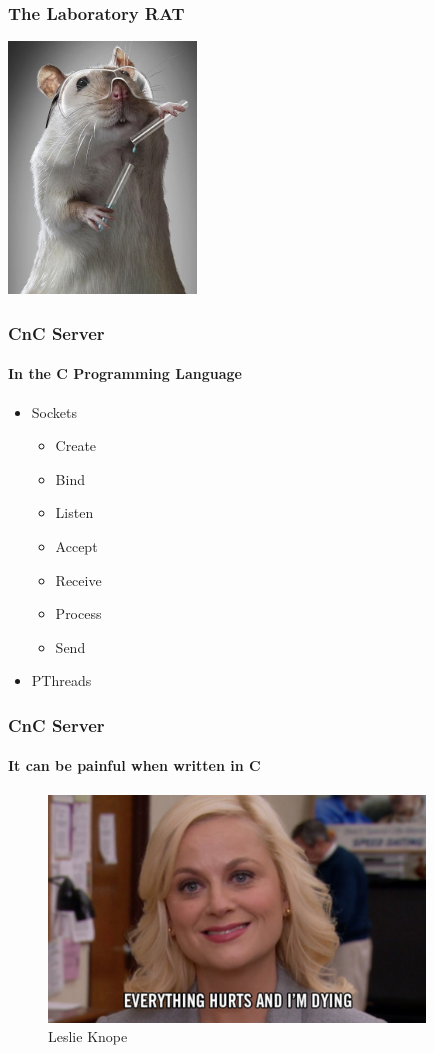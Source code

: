 \documentclass[aspectratio=169]{beamer}
\begin{document}
\begin{frame}
  \frametitle{The Laboratory RAT}
  \begin{center}
    \includegraphics[width=5cm,keepaspectratio]{lab_rat}
  \end{center}
\end{frame}

\begin{frame}
  \frametitle{CnC Server}
  \framesubtitle{In the C Programming Language}
  \begin{itemize}
  \item{Sockets}
    \begin{itemize}
    \item{Create}
    \item{Bind}
    \item{Listen}
    \item{Accept}
    \item{Receive}
    \item{Process}
    \item{Send}
    \end{itemize}
  \item{PThreads}
  \end{itemize}
\end{frame}

\begin{frame}
  \frametitle{CnC Server}
  \framesubtitle{It can be painful when written in C}
  \begin{center}
    \begin{figure}
      \includegraphics[width=10cm,keepaspectratio]{everything_hurts}
      \caption{Leslie Knope}
    \end{figure}
  \end{center}
\end{frame}
\end{document}
